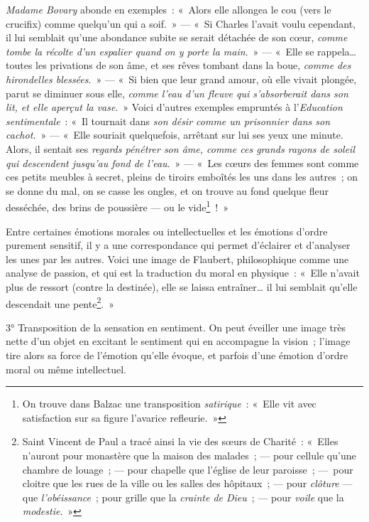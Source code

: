 \documentclass[french,twoside]{book} %
\begin{document}
\noindent \emph{Madame Bovary} abonde en exemples : « Alors elle allongea le cou (vers le crucifix) comme quelqu’un qui a soif. » — « Si Charles l’avait voulu cependant, il lui semblait qu’une abondance subite se serait détachée de son cœur, \emph{comme tombe la récolte d’un espalier quand on y porte la main}. » — « Elle se rappela… toutes les privations de son âme, et ses rêves tombant dans la boue, \emph{comme des hirondelles blessées}. » — « Si bien que leur grand amour, où elle vivait plongée, parut se diminuer sous elle, \emph{comme l’eau d’un fleuve qui s’absorberait dans son lit, et elle aperçut la vase}. » Voici d’autres exemples empruntés à l’\emph{Education sentimentale} : « Il tournait dans \emph{son désir comme un prisonnier dans son cachot.} » — « Elle souriait quelquefois, arrêtant sur lui ses yeux une minute. Alors, il sentait ses \emph{regards pénétrer son âme, comme ces grands rayons de soleil qui descendent jusqu’au fond de l’eau}. » — « Les cœurs des femmes sont comme ces petits meubles à secret, pleins de tiroirs emboîtés les uns dans les autres ; on se donne du mal, on se casse les ongles, et on trouve au fond quelque fleur desséchée, des brins de poussière — ou le vide\footnote{ On trouve dans Balzac une transposition \emph{satirique} : « Elle vit avec satisfaction sur sa figure l’avarice refleurie. »} ! »\par
Entre certaines émotions morales ou intellectuelles et les émotions d’ordre purement sensitif, il y a une correspondance qui permet d’éclairer et d’analyser les unes par les autres. Voici une image de Flaubert, philosophique comme une analyse de passion, et qui est la traduction du moral en physique : « Elle n’avait plus de ressort (contre la destinée), elle se laissa entraîner… il lui semblait qu’elle descendait une pente\footnote{ Saint Vincent de Paul a tracé ainsi la vie des sœurs de Charité : « Elles n’auront pour monastère que la maison des malades ; — pour cellule qu’une chambre de louage ; — pour chapelle que l’église de leur paroisse ; — pour cloitre que les rues de la ville ou les salles des hôpitaux ; — pour \emph{clôture} — que \emph{l’obéissance} ; pour grille que la \emph{crainte de Dieu} ; — pour \emph{voile} que la \emph{modestie}. »}. »\par
3° Transposition de la sensation en sentiment. On peut éveiller une image très nette d’un objet en excitant le sentiment qui en accompagne la vision ; l’image tire alors sa force de l’émotion qu’elle évoque, et parfois d’une émotion d’ordre moral ou même intellectuel.\par
\end{document}
